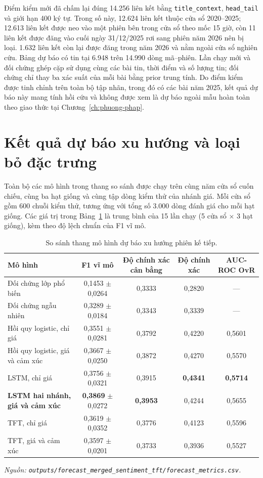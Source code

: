 \documentclass[12pt, a4paper, oneside]{report}
\begin{document}
Điểm kiểm mới đã chấm lại đúng 14.256 liên kết bằng \texttt{title\_context},
\texttt{head\_tail} và giới hạn 400 ký tự. Trong số này, 12.624 liên kết thuộc cửa sổ
2020--2025; 12.613 liên kết được neo vào một phiên bên trong cửa sổ theo mốc 15 giờ, còn
11 liên kết được đăng vào cuối ngày 31/12/2025 rơi sang phiên năm 2026 nên bị loại. 1.632
liên kết còn lại được đăng trong năm 2026 và nằm ngoài cửa sổ nghiên cứu. Bảng dự báo có
tin tại 6.948 trên 14.990 dòng mã--phiên. Lần chạy mới và đối chứng ghép cặp sử dụng cùng
các bài tin, thời điểm và số lượng tin; đối chứng chỉ thay ba xác suất của mỗi bài bằng
prior trung tính. Do điểm kiểm được tinh chỉnh trên toàn bộ tập nhãn, trong đó có các bài
năm 2025, kết quả dự báo này mang tính hồi cứu và không được xem là dự báo ngoài mẫu hoàn
toàn theo giao thức tại Chương~\ref{ch:phuong-phap}.
\section{Kết quả dự báo xu hướng và loại bỏ đặc trưng}
\label{sec:kq-forecast}

Toàn bộ các mô hình trong thang so sánh được chạy trên cùng năm cửa sổ cuốn chiếu, cùng ba hạt giống và
cùng tập dòng kiểm thử của nhánh giá. Mỗi cửa sổ gồm 600 chuỗi kiểm thử, tương ứng với tổng số 3.000 dòng
đánh giá cho mỗi hạt giống. Các giá trị trong Bảng~\ref{tab:ket-qua} là trung bình của 15 lần
chạy (5 cửa sổ $\times$ 3 hạt giống), kèm theo độ lệch chuẩn của F1 vĩ mô.

\begin{table}[H]
  \centering
  \caption{So sánh thang mô hình dự báo xu hướng phiên kế tiếp.}
  \label{tab:ket-qua}
  \begin{tabular}{l c c c c}
    \toprule
    Mô hình & F1 vĩ mô & Độ chính xác cân bằng & Độ chính xác & AUC-ROC OvR \\
    \midrule
    Đối chứng lớp phổ biến & 0,1453 $\pm$ 0,0264 & 0,3333 & 0,2820 & --- \\
    Đối chứng ngẫu nhiên & 0,3289 $\pm$ 0,0184 & 0,3343 & 0,3339 & --- \\
    Hồi quy logistic, chỉ giá & 0,3551 $\pm$ 0,0281 & 0,3792 & 0,4220 & 0,5601 \\
    Hồi quy logistic, giá và cảm xúc & 0,3667 $\pm$ 0,0250 & 0,3872 & 0,4270 & 0,5570 \\
    LSTM, chỉ giá & 0,3756 $\pm$ 0,0321 & 0,3915 & \textbf{0,4341} & \textbf{0,5714} \\
    \textbf{LSTM hai nhánh, giá và cảm xúc} & \textbf{0,3869} $\pm$ 0,0272 & \textbf{0,3953} & 0,4244 & 0,5655 \\
    TFT, chỉ giá & 0,3619 $\pm$ 0,0352 & 0,3776 & 0,4123 & 0,5596 \\
    TFT, giá và cảm xúc & 0,3597 $\pm$ 0,0201 & 0,3733 & 0,3936 & 0,5527 \\
    \bottomrule
  \end{tabular}
\noindent\textit{Nguồn: \texttt{outputs/forecast\_merged\_sentiment\_tft/forecast\_metrics.csv}.}
\end{table}
\end{document}
